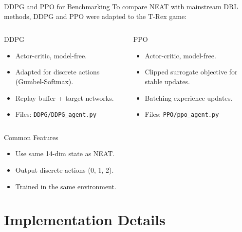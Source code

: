 \documentclass{beamer}
\begin{document}
\begin{frame}{DDPG and PPO for Benchmarking}
To compare NEAT with mainstream DRL methods, DDPG and PPO were adapted to the T-Rex game:
\begin{columns}[T]
  \begin{column}{0.5\textwidth}
    \begin{block}{DDPG}
      \begin{itemize}
          \item Actor-critic, model-free.
          \item Adapted for discrete actions (Gumbel-Softmax).
          \item Replay buffer + target networks.
          \item Files: \texttt{DDPG/DDPG\_agent.py}
      \end{itemize}
    \end{block}
  \end{column}
  \begin{column}{0.5\textwidth}
    \begin{block}{PPO}
      \begin{itemize}
          \item Actor-critic, model-free.
          \item Clipped surrogate objective for stable updates.
          \item Batching experience updates.
          \item Files: \texttt{PPO/ppo\_agent.py}
      \end{itemize}
    \end{block}
  \end{column}
\end{columns}

\vspace{0.3cm}
\begin{block}{Common Features}
\begin{itemize}
  \item Use same 14-dim state as NEAT.
  \item Output discrete actions (0, 1, 2).
  \item Trained in the same environment.
\end{itemize}
\end{block}
\end{frame}



\section{Implementation Details}
\end{document}
